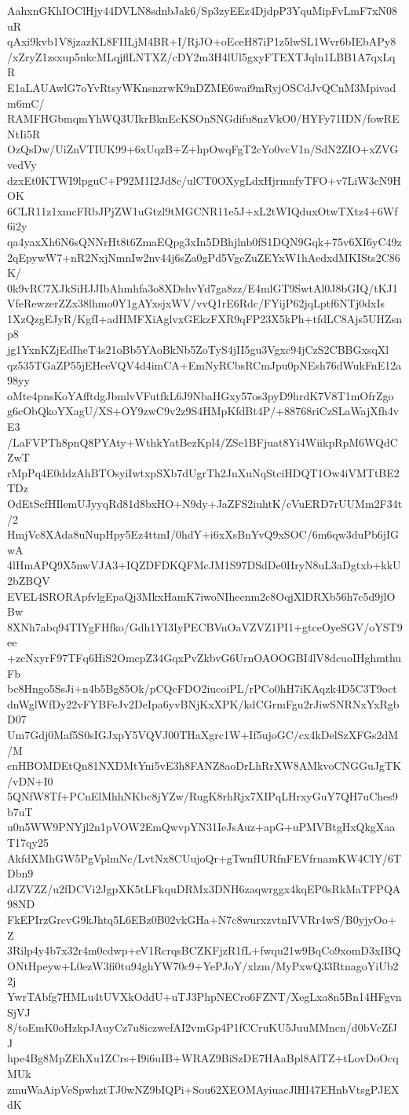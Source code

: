 AahxnGKhIOClHjy44DVLN8sdnbJak6/Sp3zyEEz4DjdpP3YquMipFvLmF7xN08uR
qAxi9kvb1V8jzazKL8FIILjM4BR+I/RjJO+oEceH87iP1z5lwSL1Wvr6bIEbAPy8
/xZryZ1zsxup5nkcMLqjflLNTXZ/cDY2m3H4lUl5gxyFTEXTJqln1LBB1A7qxLqR
E1aLAUAwlG7oYvRtsyWKnsnzrwK9nDZME6wai9mRyjOSCdJvQCnM3Mpivadm6mC/
RAMFHGbmqmYhWQ3UIkrBknEcKSOnSNGdifu8nzVkO0/HYFy71IDN/fowRENtIi5R
OzQsDw/UiZnVTIUK99+6xUqzB+Z+hpOwqFgT2cYo0vcV1n/SdN2ZIO+xZVGvedVy
dzxEt0KTWI9lpguC+P92M1I2Jd8c/ulCT0OXygLdxHjrmnfyTFO+v7LiW3cN9HOK
6CLR11z1xmcFRbJPjZW1uGtzl9tMGCNR11e5J+xL2tWIQduxOtwTXtz4+6Wf6i2y
qa4yaxXh6N6sQNNrHt8t6ZmaEQpg3xIn5DBhjlnb0fS1DQN9Gqk+75v6XI6yC49z
2qEpywW7+nR2NxjNmnIw2nv44j6sZa0gPd5VgcZuZEYxW1hAedxdMKISts2C86K/
0k9vRC7XJkSiHJJIbAhmhfa3o8XDshvYd7ga8zz/E4mlGT9SwtAl0J8bGIQ/tKJ1
VfeRewzerZZx38lhmo0Y1gAYxsjxWV/vvQ1rE6Rdc/FYijP62jqLptf6NTj0dxIs
1XzQzgEJyR/KgfI+adHMFXiAglvxGEkzFXR9qFP23X5kPh+tfdLC8Ajs5UHZsnp8
jg1YxnKZjEdIheT4s21oBb5YAoBkNb5ZoTyS4jII5gu3Vgxc94jCzS2CBBGxsqXl
qz535TGaZP55jEHeeVQV4d4imCA+EmNyRCbsRCmJpu0pNEsh76dWukFnE12a98yy
oMte4pnsKoYAfftdgJbmlvVFutfkL6J9NbaHGxy57os3pyD9hrdK7V8T1mOfrZgo
g6cObQkoYXagU/XS+OY9zwC9v2z9S4HMpKfdBt4P/+88768riCzSLaWajXfh4vE3
/LaFVPTh8pnQ8PYAty+WthkYatBezKpl4/ZSe1BFjuat8Yi4WiikpRpM6WQdCZwT
rMpPq4E0ddzAhBTOsyiIwtxpSXb7dUgrTh2JnXuNqStciHDQT1Ow4iVMTtBE2TDz
OdEtScfHIlemUJyyqRd81d8bxHO+N9dy+JaZFS2iuhtK/cVuERD7rUUMm2F34t/2
HmjVc8XAda8uNupHpy5Ez4ttmI/0hdY+i6xXsBnYvQ9xSOC/6m6qw3duPb6jIGwA
4lHmAPQ9X5nwVJA3+IQZDFDKQFMcJM1S97DSdDe0HryN8uL3aDgtxb+kkU2bZBQV
EVEL4SRORApfvlgEpaQj3MkxHamK7iwoNIhecnm2c8OqjXlDRXb56h7c5d9jlOBw
8XNh7abq94TIYgFHfko/Gdh1YI3IyPECBVnOaVZVZ1PI1+gtceOyeSGV/oYST9ee
+zcNxyrF97TFq6HiS2OmcpZ34GqxPvZkbvG6UrnOAOOGBI4lV8dcuoIHghmthuFb
bc8Hngo5SsJi+n4b5Bg85Ok/pCQcFDO2iucoiPL/rPCo0hH7iKAqzk4D5C3T9oct
dnWglWfDy22vFYBFeJv2DeIpa6yvBNjKxXPK/kdCGrmFgu2rJiwSNRNxYxRgbD07
Um7Gdj0Maf5S0sIGJxpY5VQVJ00THaXgrc1W+If5ujoGC/cx4kDelSzXFGs2dM/M
cnHBOMDEtQn81NXDMtYni5vE3h8FANZ8aoDrLhRrXW8AMkvoCNGGuJgTK/vDN+I0
5QNfW8Tf+PCnElMhhNKbc8jYZw/RugK8rhRjx7XIPqLHrxyGuY7QH7uChes9b7uT
u0n5WW9PNYjl2n1pVOW2EmQwvpYN31IeJsAuz+apG+uPMVBtgHxQkgXaaT17qy25
AkfdXMhGW5PgVplmNc/LvtNx8CUujoQr+gTwnfIURfnFEVfrnamKW4ClY/6TDbn9
dJZVZZ/u2fDCVi2JgpXK5tLFkquDRMx3DNH6zaqwrggx4kqEP0sRkMaTFPQA98ND
FkEPIrzGrcvG9kJhtq5L6EBz0B02vkGHa+N7c8wurxzvtnIVVRr4wS/B0yjyOo+Z
3Rilp4y4b7x32r4m0cdwp+eV1RcrqsBCZKFjzR1fL+fwqu21w9BqCo9xomD3xIBQ
ONtHpeyw+L0ezW3fi0tu94ghYW70c9+YePJoY/xlzm/MyPxwQ33RtnagoYiUb22j
YwrTAbfg7HMLu4tUVXkOddU+uTJ3PhpNECro6FZNT/XegLxa8n5Bn14HFgvnSjVJ
8/toEmK0oHzkpJAuyCz7u8iczwefAI2vmGp4P1fCCruKU5JuuMMncn/d0bVcZfJJ
hpe4Bg8MpZEhXu1ZCrs+I9i6uIB+WRAZ9BiSzDE7HAaBpl8AlTZ+tLovDoOcqMUk
zmuWaAipVeSpwhztTJ0wNZ9bIQPi+Sou62XEOMAyiuacJlHI47EHnbVtsgPJEXdK
